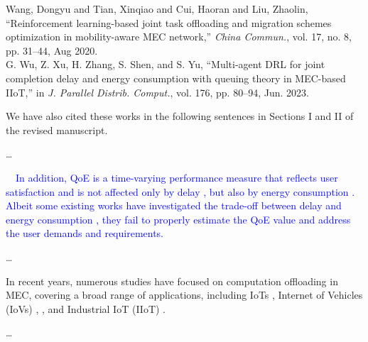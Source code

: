 \documentclass[12pt,draftclsnofoot,onecolumn]{IEEEtran}
\newcommand{\rev}[1]{{\color{blue}#1}} %
\newcommand{\rev}[1]{#1}
\newenvironment{my}[2]%
{\begin{list}{}%
{\setlength{\rightmargin}{#1}\setlength{\leftmargin}{#2}}%


 \item[]{}

} {\end{list}}
\begin{document}
\begin{enumerate}
\begin{my}{1cm}{1cm}
{{			\cite{wang2020reinforcement} Wang, Dongyu and Tian, Xinqiao and Cui, Haoran and Liu, Zhaolin, ``Reinforcement learning-based joint task offloading and migration schemes optimization in mobility-aware MEC network,'' \textit{China Commun.}, vol. 17, no. 8, pp. 31--44, Aug 2020.\\[6pt]
			\cite{wu2023multi} G. Wu, Z. Xu, H. Zhang, S. Shen, and S. Yu,  ``Multi-agent DRL for joint completion delay and energy consumption with queuing theory in MEC-based IIoT,'' in \textit{J. Parallel Distrib. Comput.}, vol. 176, pp. 80–94, Jun. 2023.
			\\[6pt]}}
\end{my}



	We have also cited these works in the following sentences in Sections I and II of the revised manuscript.\newline
	
\begin{my}{1cm}{1cm}
		\rev{
			{
	
	\dots
	
	\textcolor{blue}{	\,\,\,\, In addition, QoE is a time-varying performance measure that reflects user satisfaction and is not affected only by delay \cite{guo2022energy}, but also by energy consumption \cite{tang2022uav}. Albeit some existing works have investigated the trade-off between delay and energy consumption \cite{li2022joint}, they fail to properly estimate the QoE value and address the user demands and requirements. }
	
	\dots
	
	  In recent years, numerous studies have focused on computation offloading in MEC, covering a broad range of applications, including IoTs \cite{zhang2023multi}, Internet of Vehicles (IoVs) \cite{lin2022multi}, \cite{wei2023many}, and Industrial IoT (IIoT) \cite{yuan2023adaptive}. 

	\dots


}}
\end{my}
\end{enumerate}
\end{document}
